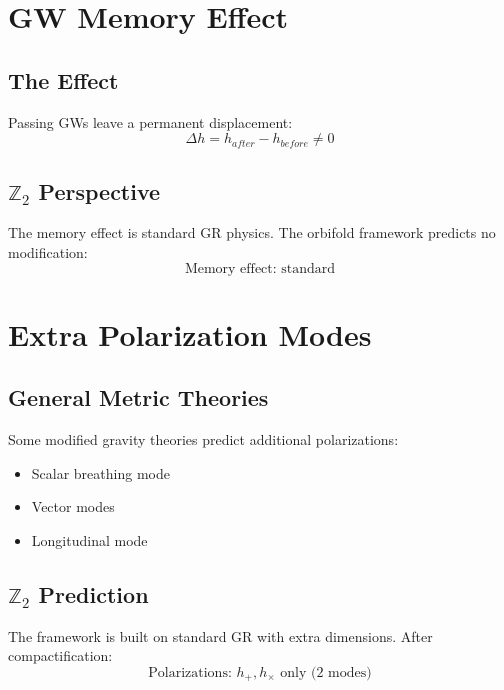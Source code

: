 \documentclass[12pt,a4paper]{article}
\begin{document}
\section{GW Memory Effect}

\subsection{The Effect}

Passing GWs leave a permanent displacement:
\begin{equation}
\Delta h = h_{after} - h_{before} \neq 0
\end{equation}

\subsection{$\mathbb{Z}_2$ Perspective}

The memory effect is standard GR physics. The orbifold framework predicts no modification:
\begin{equation}
\text{Memory effect: standard}
\end{equation}

\section{Extra Polarization Modes}

\subsection{General Metric Theories}

Some modified gravity theories predict additional polarizations:
\begin{itemize}
    \item Scalar breathing mode
    \item Vector modes
    \item Longitudinal mode
\end{itemize}

\subsection{$\mathbb{Z}_2$ Prediction}

The framework is built on standard GR with extra dimensions. After compactification:
\begin{equation}
\text{Polarizations: } h_+, h_\times \text{ only (2 modes)}
\end{equation}
\end{document}
